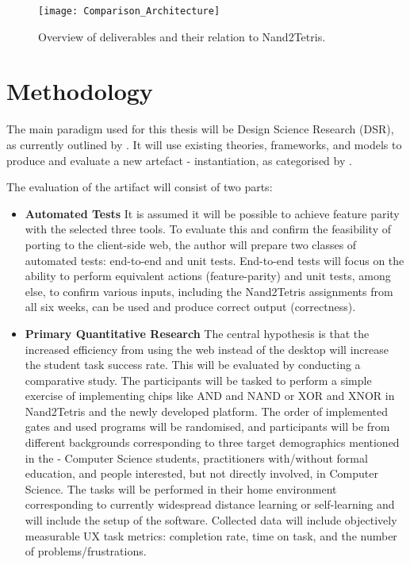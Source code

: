 \documentclass[a4paper,12pt]{report}
\begin{document}
\begin{figure}[h!]
    \centering
    \texttt{[image: Comparison\_Architecture]}
    \caption{Overview of deliverables and their relation to Nand2Tetris.}
\end{figure}

\section{Methodology}

The main paradigm used for this thesis will be Design Science Research (DSR), as currently outlined by .
It will use existing theories, frameworks, and models to produce and evaluate a new artefact - instantiation, as categorised by .

The evaluation of the artifact will consist of two parts:

\begin{itemize}
    \item \textbf{Automated Tests}
    It is assumed it will be possible to achieve feature parity with the selected three tools.
    To evaluate this and confirm the feasibility of porting to the client-side web, the author will prepare two classes of automated tests: end-to-end and unit tests.
    End-to-end tests will focus on the ability to perform equivalent actions (feature-parity) and unit tests, among else, to confirm various inputs, including the Nand2Tetris assignments from all six weeks, can be used and produce correct output (correctness).
    \item \textbf{Primary Quantitative Research}
    The central hypothesis is that the increased efficiency from using the web instead of the desktop will increase the student task success rate.
    This will be evaluated by conducting a comparative study.
    The participants will be tasked to perform a simple exercise of implementing chips like AND and NAND or XOR and XNOR in Nand2Tetris and the newly developed platform.
    The order of implemented gates and used programs will be randomised, and participants will be from different backgrounds corresponding to three target demographics mentioned in the  - Computer Science students, practitioners with/without formal education, and people interested, but not directly involved, in Computer Science.
    The tasks will be performed in their home environment corresponding to currently widespread distance learning or self-learning and will include the setup of the software.
    Collected data will include objectively measurable UX task metrics: completion rate, time on task, and the number of problems/frustrations.
\end{itemize}
\end{document}
